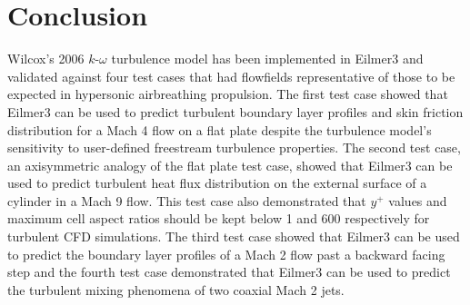 
\newpage
\section{Conclusion}
\label{chapter-conclusion}
Wilcox's 2006 $k$-$\omega$ turbulence model has been implemented in 
Eilmer3 and validated against four test cases that had flowfields 
representative of those to be expected in hypersonic airbreathing 
propulsion. The first test case showed that Eilmer3 can be used to 
predict turbulent boundary layer profiles 
and skin friction distribution for a Mach 4 flow on a flat plate 
despite the turbulence model's sensitivity to user-defined freestream 
turbulence properties. The second test case, an axisymmetric analogy 
of the flat plate test case, showed that Eilmer3 can be used to 
predict turbulent heat flux distribution on the external surface of a cylinder 
in a Mach 9 flow. This test case also demonstrated that $y^+$ values
and maximum cell aspect ratios should be kept below 1 and 600
respectively for turbulent CFD simulations. The third test case showed
that Eilmer3 can be used to predict the boundary layer profiles of
a Mach 2 flow past a backward facing step and the fourth test case
demonstrated that Eilmer3 can be used to predict the turbulent mixing 
phenomena of two coaxial Mach 2 jets. 
%
